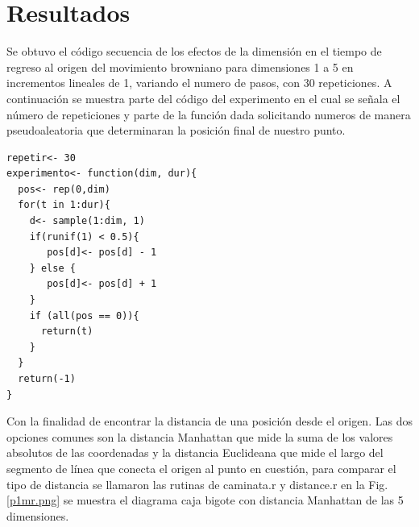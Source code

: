 \documentclass[a4paper]{article}
\begin{document}
\section{Resultados}
\justify
Se obtuvo el código secuencia de los efectos de la dimensión en el tiempo de regreso al origen del movimiento browniano para dimensiones 1 a 5 en incrementos lineales de 1, variando el numero de pasos, con 30 repeticiones.
A continuación se muestra parte del código del experimento\cite{gitadrian} en el cual se señala el número de repeticiones y parte de la función dada solicitando numeros de manera pseudoaleatoria que determinaran la posición final de nuestro punto. 
\begin{lstlisting}
repetir<- 30
experimento<- function(dim, dur){
  pos<- rep(0,dim)
  for(t in 1:dur){         
    d<- sample(1:dim, 1)
    if(runif(1) < 0.5){    
       pos[d]<- pos[d] - 1 
    } else {               
       pos[d]<- pos[d] + 1 
    }
    if (all(pos == 0)){    
      return(t)
    }
  }
  return(-1)
}
\end{lstlisting}
\medskip
\justify
Con la finalidad de encontrar la distancia de una posición  desde el origen. Las dos opciones comunes son la distancia Manhattan que mide la suma de los valores absolutos de las coordenadas y la distancia Euclideana que mide el largo del segmento de línea que conecta el origen al punto en cuestión,\cite{ejemplo} para comparar el tipo de distancia se llamaron las rutinas de caminata.r\cite{caminata} y distance.r\cite{distance} en la Fig.\ref{p1mr.png} se muestra el diagrama caja bigote con distancia Manhattan de las 5 dimensiones.  
\end{document}
